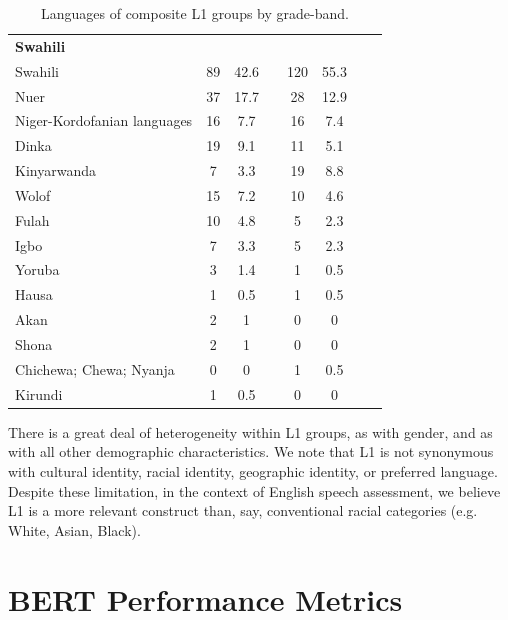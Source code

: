 \documentclass [PhD] {uclathes}
\begin{document}
\begin{table}[htbp]
\begin{tabular}{lccccccc}
\textbf{Swahili} & & & & & \\
\hspace{3mm} Swahili & 89 & 42.6 & & 120 & 55.3 \\
\hspace{3mm} Nuer & 37 & 17.7 & & 28 & 12.9 \\
\hspace{3mm} Niger-Kordofanian languages & 16 & 7.7 & & 16 & 7.4 \\
\hspace{3mm} Dinka & 19 & 9.1 & & 11 & 5.1 \\
\hspace{3mm} Kinyarwanda & 7 & 3.3 & & 19 & 8.8 \\
\hspace{3mm} Wolof & 15 & 7.2 & & 10 & 4.6 \\
\hspace{3mm} Fulah & 10 & 4.8 & & 5 & 2.3 \\
\hspace{3mm} Igbo & 7 & 3.3 & & 5 & 2.3 \\
\hspace{3mm} Yoruba & 3 & 1.4 & & 1 & 0.5 \\
\hspace{3mm} Hausa & 1 & 0.5 & & 1 & 0.5 \\
\hspace{3mm} Akan & 2 & 1 & & 0 & 0 \\
\hspace{3mm} Shona & 2 & 1 & & 0 & 0 \\
\hspace{3mm} Chichewa; Chewa; Nyanja & 0 & 0 & & 1 & 0.5 \\
\hspace{3mm} Kirundi & 1 & 0.5 & & 0 & 0 \\
    \bottomrule
    \end{tabular}
\caption{\label{lang_grp}
Languages of composite L1 groups by grade-band.}
\end{table}

There is a great deal of heterogeneity within L1 groups, as with gender, and as with all other demographic characteristics. We note that L1 is not synonymous with cultural identity, racial identity, geographic identity, or preferred language. Despite these limitation, in the context of English speech assessment, we believe L1 is a more relevant construct than, say, conventional racial categories (e.g. White, Asian, Black). 

\section{BERT Performance Metrics}
\label{sec:appendix_perf}
\end{document}
